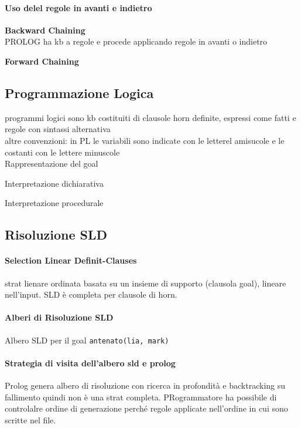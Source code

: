 \documentclass[10pt]{book}
\begin{document}
\paragraph{Uso delel regole in avanti e indietro} %
\begin{list}{}{}
	\item \textbf{Backward Chaining}\\
	PROLOG ha kb a regole e procede applicando regole in avanti o indietro
	\item \textbf{Forward Chaining}
\end{list}
\subsection{Programmazione Logica}
programmi logici sono kb costituiti di clausole horn definite, espressi come fatti e regole con sintassi alternativa %
\\
altre convenzioni: in PL le variabili sono indicate con le letterel amisucole e le costanti con le lettere minuscole\\
Rappresentazione del goal
\begin{list}{}{}
	\item %
\end{list}
\begin{list}{}{}
	\item Interpretazione dichiarativa
	\item Interpretazione procedurale
\end{list}
\subsection{Risoluzione SLD}
\paragraph{Selection Linear Definit-Clauses} strat lienare ordinata basata su un insieme di supporto (clausola goal), lineare nell'input. SLD è completa per clausole di horn.
\paragraph{Alberi di Risoluzione SLD}
Albero SLD per il goal \texttt{antenato(lia, mark)}\\ %
\paragraph{Strategia di visita dell'albero sld e prolog}
Prolog genera albero di risoluzione con ricerca in profondità e backtracking su fallimento quindi non è una strat completa. PRogrammatore ha possibile di controlalre ordine di generazione perché regole applicate nell'ordine in cui sono scritte nel file.\\
\end{document}
